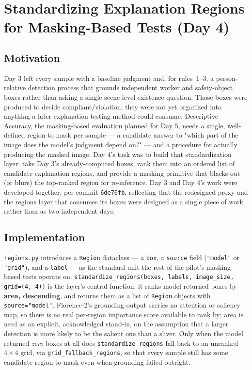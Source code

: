 \chapter{Standardizing Explanation Regions for Masking-Based Tests (Day 4)}
\label{chap:day04}

\section{Motivation}

Day 3 left every sample with a baseline judgment and, for rules~1--3, a person-relative detection
process that grounds independent worker and safety-object boxes rather than asking a single
scene-level existence question. Those boxes were produced to decide compliant/violation; they were
not yet organized into anything a later explanation-testing method could consume. Descriptive
Accuracy, the masking-based evaluation planned for Day 5, needs a single, well-defined region to
mask per sample --- a candidate answer to "which part of the image does the model's judgment depend
on?" --- and a procedure for actually producing the masked image. Day 4's task was to build that
standardization layer: take Day 3's already-computed boxes, rank them into an ordered list of
candidate explanation regions, and provide a masking primitive that blacks out (or blurs) the
top-ranked region for re-inference. Day 3 and Day 4's work were developed together, per commit
\texttt{6de76fb}, reflecting that the redesigned proxy and the regions layer that consumes its boxes
were designed as a single piece of work rather than as two independent days.

\section{Implementation}

\texttt{regions.py} introduces a \texttt{Region} dataclass --- a \texttt{box}, a \texttt{source}
field (\texttt{"model"} or \texttt{"grid"}), and a \texttt{label} --- as the standard unit the rest
of the pilot's masking-based tests operate on. \texttt{standardize\_regions(boxes, labels,
image\_size, grid=(4, 4))} is the layer's central function: it ranks model-returned boxes by
\textbf{area, descending}, and returns them as a list of \texttt{Region} objects with
\texttt{source="model"}. Florence-2's grounding output carries no attention or saliency map, so
there is no real per-region importance score available to rank by; area is used as an explicit,
acknowledged stand-in, on the assumption that a larger detection is more likely to be the salient
one than a sliver. Only when the model returned \emph{zero} boxes at all does
\texttt{standardize\_regions} fall back to an unranked $4\times4$ grid, via
\texttt{grid\_fallback\_regions}, so that every sample still has some candidate region to mask even
when grounding failed outright.

